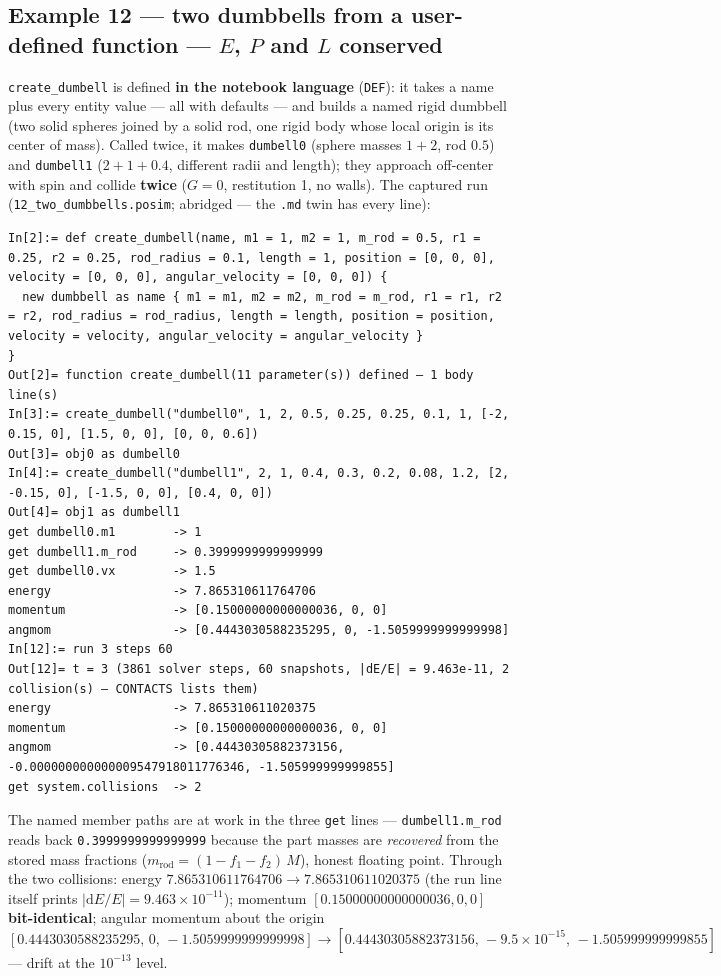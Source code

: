 \documentclass[11pt]{article}
\newcommand{\kw}[1]{\texttt{\uppercase{#1}}}
\newcommand{\code}[1]{\texttt{#1}}
\begin{document}
\subsection{Example 12 --- two dumbbells from a user-defined function ---
$E$, $P$ and $L$ conserved}
\code{create\_dumbell} is defined \textbf{in the notebook language}
(\kw{def}): it takes a name plus every entity value --- all with
defaults --- and builds a named rigid dumbbell (two solid spheres joined by
a solid rod, one rigid body whose local origin is its center of mass).
Called twice, it makes \code{dumbell0} (sphere masses $1 + 2$, rod $0.5$)
and \code{dumbell1} ($2 + 1 + 0.4$, different radii and length); they
approach off-center with spin and collide \textbf{twice} ($G = 0$,
restitution 1, no walls). The captured run
(\code{12\_two\_dumbbells.posim}; abridged --- the \code{.md} twin has
every line):
\begin{lstlisting}
In[2]:= def create_dumbell(name, m1 = 1, m2 = 1, m_rod = 0.5, r1 = 0.25, r2 = 0.25, rod_radius = 0.1, length = 1, position = [0, 0, 0], velocity = [0, 0, 0], angular_velocity = [0, 0, 0]) {
  new dumbbell as name { m1 = m1, m2 = m2, m_rod = m_rod, r1 = r1, r2 = r2, rod_radius = rod_radius, length = length, position = position, velocity = velocity, angular_velocity = angular_velocity }
}
Out[2]= function create_dumbell(11 parameter(s)) defined — 1 body line(s)
In[3]:= create_dumbell("dumbell0", 1, 2, 0.5, 0.25, 0.25, 0.1, 1, [-2, 0.15, 0], [1.5, 0, 0], [0, 0, 0.6])
Out[3]= obj0 as dumbell0
In[4]:= create_dumbell("dumbell1", 2, 1, 0.4, 0.3, 0.2, 0.08, 1.2, [2, -0.15, 0], [-1.5, 0, 0], [0.4, 0, 0])
Out[4]= obj1 as dumbell1
get dumbell0.m1        -> 1
get dumbell1.m_rod     -> 0.3999999999999999
get dumbell0.vx        -> 1.5
energy                 -> 7.865310611764706
momentum               -> [0.15000000000000036, 0, 0]
angmom                 -> [0.4443030588235295, 0, -1.5059999999999998]
In[12]:= run 3 steps 60
Out[12]= t = 3 (3861 solver steps, 60 snapshots, |dE/E| = 9.463e-11, 2 collision(s) — CONTACTS lists them)
energy                 -> 7.865310611020375
momentum               -> [0.15000000000000036, 0, 0]
angmom                 -> [0.44430305882373156, -0.000000000000009547918011776346, -1.505999999999855]
get system.collisions  -> 2
\end{lstlisting}
The named member paths are at work in the three \code{get} lines ---
\code{dumbell1.m\_rod} reads back \code{0.3999999999999999} because the
part masses are \emph{recovered} from the stored mass fractions
($m_{\mathrm{rod}} = (1 - f_1 - f_2)\,M$), honest floating point. Through
the two collisions: energy
$7.865310611764706 \to 7.865310611020375$ (the run line itself prints
$|\mathrm dE/E| = 9.463\times10^{-11}$); momentum
$[0.15000000000000036, 0, 0]$ \textbf{bit-identical}; angular momentum
about the origin
$[0.4443030588235295,\, 0,\, -1.5059999999999998] \to
[0.44430305882373156,\, -9.5\times10^{-15},\, -1.505999999999855]$ ---
drift at the $10^{-13}$ level.
\end{document}
